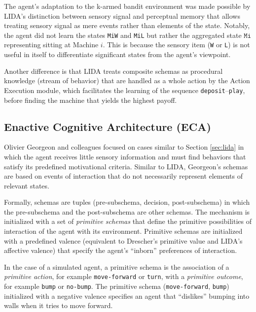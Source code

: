 \documentclass[runningheads]{llncs}
\begin{document}
The agent's adaptation to the k-armed bandit environment was made possible by LIDA's distinction between sensory signal and perceptual memory that allows treating sensory signal as mere events rather than elements of the state. 
Notably, the agent did not learn the states \texttt{MiW} and \texttt{MiL} but rather the aggregated state $\texttt{Mi}$ representing sitting at Machine $i$.
This is because the sensory item (\texttt{W} or \texttt{L}) is not useful in itself to differentiate significant states from the agent's viewpoint. 

Another difference is that LIDA treats composite schemas as procedural knowledge (stream of behavior) that are handled as a whole action by the Action Execution module, which facilitates the learning of the sequence \texttt{deposit}--\texttt{play}, before finding the machine that yields the highest payoff. 

\subsection{Enactive Cognitive Architecture (ECA)}

Olivier Georgeon and colleagues focused on cases similar to Section \ref{sec:lida} in which the agent receives little sensory information and must find behaviors that satisfy its predefined motivational criteria. 
Similar to LIDA, Georgeon's schemas are based on events of interaction that do not necessarily represent elements of relevant states.  

Formally, schemas are tuples (pre-subschema, decision, post-subschema) in which the pre-subschema and the post-subschema are other schemas.  
The mechanism is initialized with a set of \textit{primitive schemas} that define the primitive possibilities of interaction of the agent with its environment. 
Primitive schemas are initialized with a predefined valence (equivalent to Drescher's primitive value and LIDA's affective valence) that specify the agent's ``inborn'' preferences of interaction. 

In the case of a simulated agent, a primitive schema is the association of a \textit{primitive action}, for example \texttt{move-forward} or \texttt{turn}, with a \textit{primitive outcome}, for example \texttt{bump} or \texttt{no-bump}.  
The primitive schema (\texttt{move-forward}, \texttt{bump}) initialized with a negative valence specifies an agent that ``dislikes'' bumping into walls when it tries to move forward. 
\end{document}
